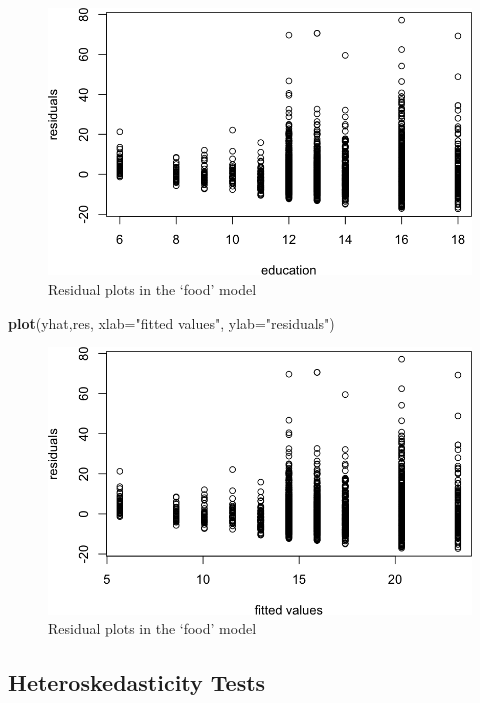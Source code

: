 \documentclass[]{book}
\newenvironment{Shaded}{\begin{snugshade}}{\end{snugshade}}
\newcommand{\DataTypeTok}[1]{\textcolor[rgb]{0.13,0.29,0.53}{#1}}
\newcommand{\KeywordTok}[1]{\textcolor[rgb]{0.13,0.29,0.53}{\textbf{#1}}}
\newcommand{\NormalTok}[1]{#1}
\newcommand{\StringTok}[1]{\textcolor[rgb]{0.31,0.60,0.02}{#1}}
\begin{document}
\begin{figure}

{\centering \includegraphics[width=0.8\linewidth]{MEM5220_R_files/figure-latex/fig19-1} 

}

\caption{Residual plots in the ‘food’ model }\label{fig:fig191}
\end{figure}

\begin{Shaded}
\begin{Highlighting}[]
\KeywordTok{plot}\NormalTok{(yhat,res, }\DataTypeTok{xlab=}\StringTok{"fitted values"}\NormalTok{, }\DataTypeTok{ylab=}\StringTok{"residuals"}\NormalTok{)}
\end{Highlighting}
\end{Shaded}

\begin{figure}

{\centering \includegraphics[width=0.8\linewidth]{MEM5220_R_files/figure-latex/fig19-2} 

}

\caption{Residual plots in the ‘food’ model }\label{fig:fig192}
\end{figure}

\hypertarget{heteroskedasticity-tests}{%
\subsection{Heteroskedasticity Tests}\label{heteroskedasticity-tests}}
\end{document}
